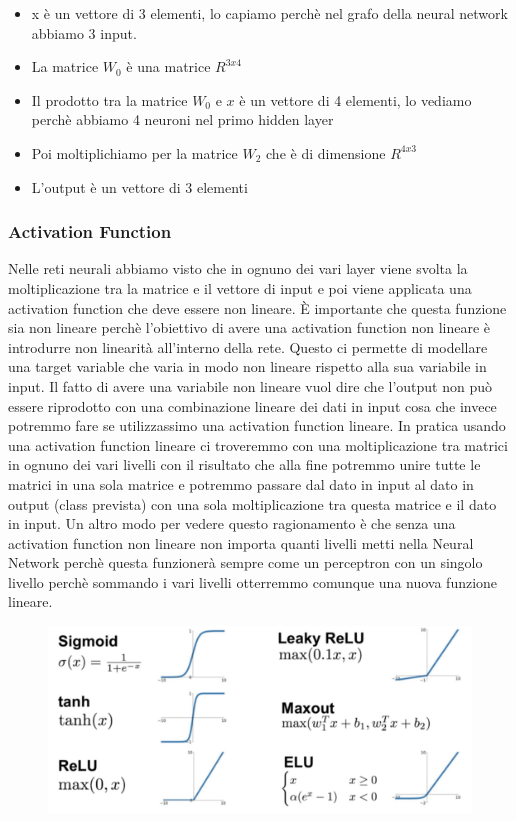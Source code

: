 \documentclass[14pt]{extreport}
\begin{document}
\begin{itemize}
\item x è un vettore di 3 elementi, lo capiamo perchè nel grafo della neural network abbiamo 3 input.
\item La matrice $W_0$ è una matrice $R^{3x4}$
\item Il prodotto tra la matrice $W_0$ e $x$ è un vettore di 4 elementi, lo vediamo perchè abbiamo 4 neuroni nel primo hidden layer
\item Poi moltiplichiamo per la matrice $W_2$ che è di dimensione $R^{4x3}$
\item L'output è un vettore di 3 elementi
\end{itemize}

\subsubsection{Activation Function}

Nelle reti neurali abbiamo visto che in ognuno dei vari layer viene svolta la moltiplicazione tra la matrice e il vettore di input e poi viene
applicata una activation function che deve essere non lineare. È importante che questa funzione sia non lineare perchè l'obiettivo di avere una
activation function non lineare è introdurre non linearità all'interno della rete. Questo ci permette di modellare una target variable che varia in
modo non lineare rispetto alla sua variabile in input. Il fatto di avere una variabile non lineare vuol dire che l'output non può essere riprodotto
con una combinazione lineare dei dati in input cosa che invece potremmo fare se utilizzassimo una activation function lineare. In pratica usando una
activation function lineare ci troveremmo con una moltiplicazione tra matrici in ognuno dei vari livelli con il risultato che alla fine potremmo unire
tutte le matrici in una sola matrice e potremmo passare dal dato in input al dato in output (class prevista) con una sola moltiplicazione tra questa
matrice e il dato in input. Un altro modo per vedere questo ragionamento è che senza una activation function non lineare non importa quanti livelli
metti nella Neural Network perchè questa funzionerà sempre come un perceptron con un singolo livello perchè sommando i vari livelli otterremmo
comunque una nuova funzione lineare.

\begin{figure}[H]
\centering
\includegraphics[width=0.7\linewidth]{371.jpeg}
\end{figure}
\end{document}

